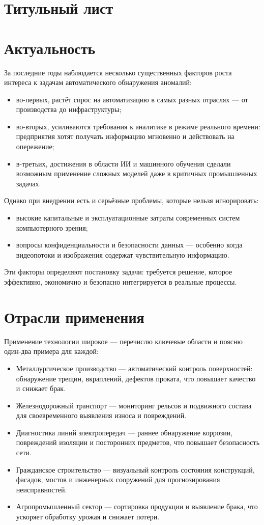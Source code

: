 \documentclass[14 pt,a4paper]{article}
\begin{document}
	
\section{Титульный лист}
\section{Актуальность} 
За последние годы наблюдается несколько существенных факторов роста интереса к задачам автоматического обнаружения аномалий:
\begin{itemize}
	\item во-первых, растёт спрос на автоматизацию в самых разных отраслях — от производства до инфраструктуры;
	\item во-вторых, усиливаются требования к аналитике в режиме реального времени: предприятия хотят получать информацию мгновенно и действовать на опережение;
	\item в-третьих, достижения в области ИИ и машинного обучения сделали возможным применение сложных моделей даже в критичных промышленных задачах.
\end{itemize}
Однако при внедрении есть и серьёзные проблемы, которые нельзя игнорировать:
\begin{itemize}
	\item высокие капитальные и эксплуатационные затраты современных систем компьютерного зрения;
	\item вопросы конфиденциальности и безопасности данных — особенно когда видеопотоки и изображения содержат чувствительную информацию.
\end{itemize}
Эти факторы определяют постановку задачи: требуется решение, которое эффективно, экономично и безопасно интегрируется в реальные процессы.
\section{Отрасли применения}
Применение технологии широкое — перечислю ключевые области и поясню один-два примера для каждой:
\begin{itemize}
	\item Металлургическое производство — автоматический контроль поверхностей: обнаружение трещин, вкраплений, дефектов проката, что повышает качество и снижает брак.
	\item Железнодорожный транспорт — мониторинг рельсов и подвижного состава для своевременного выявления износа и повреждений.
	\item Диагностика линий электропередач — раннее обнаружение коррозии, повреждений изоляции и посторонних предметов, что повышает безопасность сети.
	\item Гражданское строительство — визуальный контроль состояния конструкций, фасадов, мостов и инженерных сооружений для прогнозирования неисправностей.
	\item Агропромышленный сектор — сортировка продукции и выявление брака, что ускоряет обработку урожая и снижает потери.
\end{itemize}
\end{document}
